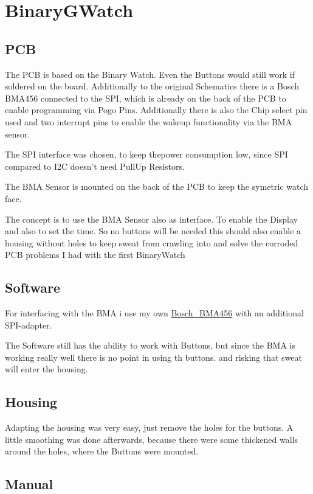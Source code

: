 \section{BinaryGWatch}
\subsection{PCB}
The PCB is based on the Binary Watch. Even the Buttons would still work if soldered on the board. Additionally to the original Schematics there is a Bosch BMA456 connected to the SPI, which is already on the back of the PCB to enable programming via Pogo Pins. Additionally there is also the Chip select pin used and two interrupt pins to enable the wakeup functionality via the BMA sensor. 

The SPI interface was chosen, to keep thepower consumption low, since SPI compared to I2C doesn't need PullUp Resistors.

The BMA Sensor is mounted on the back of the PCB to keep the symetric watch face.

The concept is to use the BMA Sensor also as interface. To enable the Display and also to set the time. So no buttons will be needed this should also enable a housing without holes to keep sweat from crawling into and solve the corroded PCB problems I had with the first BinaryWatch
\subsection{Software}
For interfacing with the BMA i use my own \href{https://github.com/sulkith/Bosch_BMA456}{Bosch\_BMA456} with an additional SPI-adapter.

The Software still has the ability to work with Buttons, but since the BMA is working really well there is no point in using th buttons. and risking that sweat will enter the housing.
\subsection{Housing}
Adapting the housing was very easy, just remove the holes for the buttons.
A little smoothing was done afterwards, because there were some thickened walls around the holes, where the Buttons were mounted.
\subsection{Manual}
